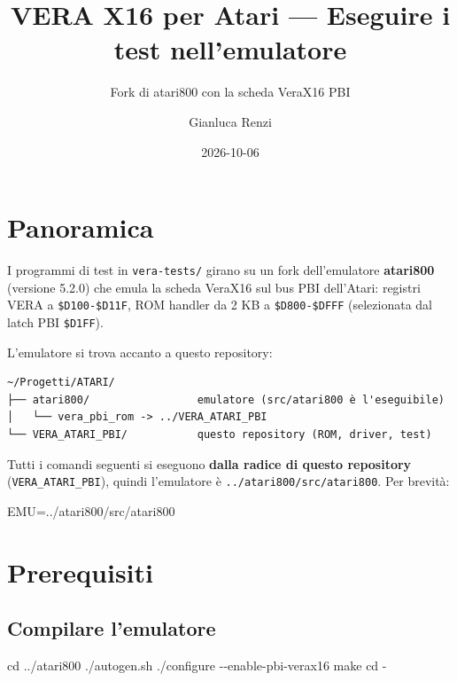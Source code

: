 \documentclass[
]{article}
\title{VERA X16 per Atari --- Eseguire i test nell'emulatore}
\subtitle{Fork di atari800 con la scheda VeraX16 PBI}
\author{Gianluca Renzi}
\date{2026-10-06}
\newenvironment{Shaded}{}{}
\newcommand{\AttributeTok}[1]{\textcolor[rgb]{0.49,0.56,0.16}{#1}}
\newcommand{\BuiltInTok}[1]{\textcolor[rgb]{0.00,0.50,0.00}{#1}}
\newcommand{\ExtensionTok}[1]{#1}
\newcommand{\FunctionTok}[1]{\textcolor[rgb]{0.02,0.16,0.49}{#1}}
\newcommand{\NormalTok}[1]{#1}
\newcommand{\OperatorTok}[1]{\textcolor[rgb]{0.40,0.40,0.40}{#1}}
\newcommand{\VariableTok}[1]{\textcolor[rgb]{0.10,0.09,0.49}{#1}}
\begin{document}
\maketitle

{
\hypersetup{linkcolor=}
\setcounter{tocdepth}{3}
\tableofcontents
}
\section{Panoramica}\label{panoramica}

I programmi di test in \texttt{vera-tests/} girano su un fork
dell'emulatore \textbf{atari800} (versione 5.2.0) che emula la scheda
VeraX16 sul bus PBI dell'Atari: registri VERA a \texttt{\$D100-\$D11F},
ROM handler da 2 KB a \texttt{\$D800-\$DFFF} (selezionata dal latch PBI
\texttt{\$D1FF}).

L'emulatore si trova accanto a questo repository:

\begin{verbatim}
~/Progetti/ATARI/
├── atari800/                 emulatore (src/atari800 è l'eseguibile)
│   └── vera_pbi_rom -> ../VERA_ATARI_PBI
└── VERA_ATARI_PBI/           questo repository (ROM, driver, test)
\end{verbatim}

Tutti i comandi seguenti si eseguono \textbf{dalla radice di questo
repository} (\texttt{VERA\_ATARI\_PBI}), quindi l'emulatore è
\texttt{../atari800/src/atari800}. Per brevità:

\begin{Shaded}
\begin{Highlighting}[]
\VariableTok{EMU}\OperatorTok{=}\NormalTok{../atari800/src/atari800}
\end{Highlighting}
\end{Shaded}

\section{Prerequisiti}\label{prerequisiti}

\subsection{Compilare l'emulatore}\label{compilare-lemulatore}

\begin{Shaded}
\begin{Highlighting}[]
\BuiltInTok{cd}\NormalTok{ ../atari800}
\ExtensionTok{./autogen.sh}
\ExtensionTok{./configure} \AttributeTok{{-}{-}enable{-}pbi{-}verax16}
\FunctionTok{make}
\BuiltInTok{cd} \AttributeTok{{-}}
\end{Highlighting}
\end{Shaded}
\end{document}
